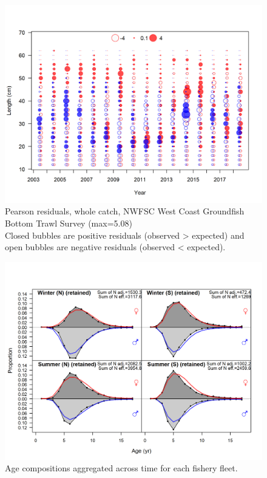 \documentclass[12pt,]{article}
\begin{document}
\begin{figure}
\centering
\includegraphics{r4ss/plots_mod1/comp_lenfit_residsflt7mkt0.png}
\caption{Pearson residuals, whole catch, NWFSC West Coast Groundfish
Bottom Trawl Survey (max=5.08)\\
Closed bubbles are positive residuals (observed \textgreater{} expected)
and open bubbles are negative residuals (observed \textless{} expected).
\label{fig:nwfsc_combo_len_pearson}}
\end{figure}

\begin{figure}
\centering
\includegraphics{r4ss/plots_mod1/comp_agefit__aggregated_across_time.png}
\caption{Age compositions aggregated across time for each fishery fleet.
\label{fig:age_agg}}
\end{figure}
\end{document}
